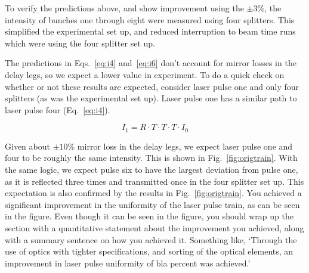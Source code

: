 \documentclass{iitthesis}
\newcommand{\lsnote}[1]{\textsf{{\color{violet}{ LS note:}   #1 }}}
\begin{document}
To verify the predictions above, and show improvement using the $\pm3\%$,
the intensity of bunches one through eight were measured using four splitters. 
This simplified the experimental set up, and reduced interruption to beam time 
runs which were using the four splitter set up.  

The predictions in Eqs.~\ref{eq:i4} and~\ref{eq:i6} don't account for mirror losses in the delay legs, 
so we expect a lower value in experiment. To do a quick check on whether or not these results are 
expected, consider laser pulse one and only four splitters (as was the experimental set up). 
Laser pulse one has a similar path to laser pulse four (Eq.~\ref{eq:i4}). 

\begin{equation}
I_1 = R \cdot T \cdot T \cdot T \cdot I_0 
\end{equation}

Given about $\pm10\%$ mirror loss in the delay legs, we expect laser pulse one and four 
to be roughly the same intensity. This is shown in Fig.~\ref{fig:origtrain}. With the same 
logic, we expect pulse six to have the largest deviation from pulse one, as it is reflected 
three times and transmitted once in the four splitter set up. This expectation is also 
confirmed by the results in Fig.~\ref{fig:origtrain}.  \lsnote{You achieved a significant improvement in the uniformity of the laser pulse train, as can be seen in the figure.  Even though it can be seen in the figure, you should wrap up the section with a quantitative statement about the improvement you achieved, along with a summary sentence on how you achieved it.  Something like, `Through the use of optics with tighter specifications, and sorting of the optical elements, an improvement in laser pulse uniformity of bla percent was achieved.'}  
\end{document}
